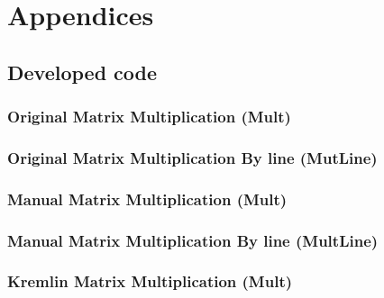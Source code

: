 \chapter{Appendices} \label{ap1:}

\section{Developed code}


\subsection{Original Matrix Multiplication (Mult)}

 

\subsection{Original Matrix Multiplication By line (MutLine)}



\subsection{Manual Matrix Multiplication (Mult)}



\subsection{Manual Matrix Multiplication By line (MultLine)}


	
\subsection{Kremlin Matrix Multiplication (Mult)}

